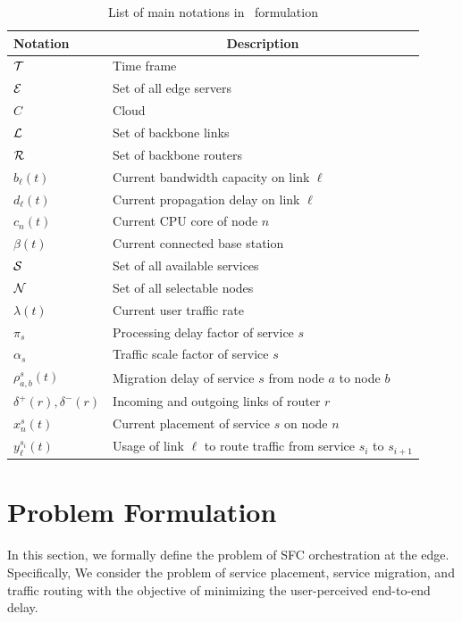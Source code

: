 \begin{table}[t]
	\centering
	\caption{List of main notations in \myproblem\ formulation}
	\begin{tabular}{ll}
		\toprule
		Notation & \multicolumn{1}{c}{Description} \\
		\midrule
		$\mathcal{T}$ & Time frame \\
		$\mathcal{E}$ &  Set of all edge servers\\
		$C$ &  Cloud \\
		$\mathcal{L}$ &  Set of backbone links\\
		$\mathcal{R}$ & Set of backbone routers\\
		$b_{\ell}(t)$ & Current bandwidth capacity on link $\ell$\\
		$d_{\ell} (t)$ & Current propagation delay on link $\ell$ \\
		$c_{n}(t)$ & Current CPU core of node $n$ \\
		$\beta (t)$ & Current connected base station \\
		$\mathcal{S}$ & Set of all available services \\
		$\mathcal{N}$ & Set of all selectable nodes\\
		$\lambda(t)$ & Current user traffic rate \\
		$\pi_{s}$ & Processing delay factor of service $s$ \\
		$\alpha_{s}$ & Traffic scale factor of service $s$ \\
		$\rho_{a, b}^{s}(t)$ & Migration delay of service $s$ from node $a$ to node $b$ \\
		$\delta^{+}(r), \delta^{-}(r)$ & Incoming and outgoing links of router $r$\\
		$x^s_n(t)$ & Current placement of service $s$ on node $n$\\
		$y^{s_i}_\ell(t)$ & Usage of link $\ell$ to route traffic from service $s_i$ to $s_{i+1}$  \\
		
		\bottomrule
	\end{tabular}
	\label{tab:System parameter}
\end{table}



\section{Problem Formulation}
\label{section: formulation}
In this section, we formally define the problem of SFC orchestration at the edge. Specifically, We consider the problem of service placement, service migration, and traffic routing with the objective of minimizing the user-perceived end-to-end delay. 


